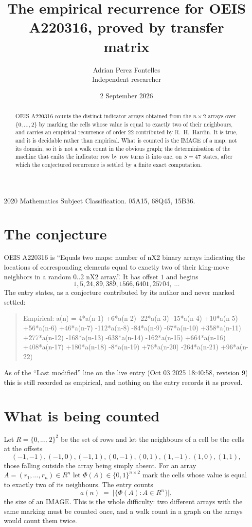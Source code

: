 \documentclass[11pt,a4paper]{article}
\title{The empirical recurrence for OEIS A220316, proved by transfer matrix}
\author{Adrian Perez Fontelles\\ \small Independent researcher}
\date{2 September 2026}
\theoremstyle{plain}
\theoremstyle{definition}
\begin{document}
\maketitle

\begin{abstract}
OEIS A220316 counts the distinct indicator arrays obtained from the $n\times2$ arrays over
$\{0,\dots,2\}$ by marking the cells whose value is equal to exactly two of their neighbours, and carries an
empirical recurrence of order $22$ contributed by R.~H.~Hardin. It is true, and it is
decidable rather than empirical. What is counted is the IMAGE of a map, not its domain, so it
is not a walk count in the obvious graph; the determinisation of the machine that emits the
indicator row by row turns it into one, on $S=47$ states, after which the conjectured
recurrence is settled by a finite exact computation.
\end{abstract}

\noindent\small 2020 Mathematics Subject Classification. 05A15, 68Q45, 15B36.\normalsize

\section{The conjecture}

OEIS A220316 is ``Equals two maps: number of nX2 binary arrays indicating the locations of corresponding elements equal to exactly two of their king-move neighbors in a random 0..2 nX2 array.''. It has offset $1$ and begins
\[
1, 5, 24, 89, 389, 1566, 6401, 25704,\ \dots
\]
The entry states, as a conjecture contributed by its author and never marked settled:
\begin{quote}
Empirical: a(n) = 4*a(n-1) +6*a(n-2) -22*a(n-3) -15*a(n-4) +10*a(n-5) +56*a(n-6) +46*a(n-7) -112*a(n-8) -84*a(n-9) -67*a(n-10) +358*a(n-11) +277*a(n-12) -168*a(n-13) -638*a(n-14) -162*a(n-15) +664*a(n-16) +408*a(n-17) +180*a(n-18) -8*a(n-19) +76*a(n-20) -264*a(n-21) +96*a(n-22)
\end{quote}
As of the ``Last modified'' line on the live entry (Oct 03 2025 18:40:58, revision 9) this is still
recorded as empirical, and nothing on the entry records it as proved.

\section{What is being counted}

Let $R=\{0,\dots,2\}^{2}$ be the set of rows and let the neighbours of a cell be the
cells at the offsets
\[
(-1,-1), (-1,0), (-1,1), (0,-1), (0,1), (1,-1), (1,0), (1,1),
\]
those falling outside the array being simply absent. For an array
$A=(r_1,\dots,r_n)\in R^n$ let $\Phi(A)\in\{0,1\}^{n\times2}$ mark the cells whose value
is equal to exactly two of its neighbours. The entry counts
\[
a(n)\;=\;\bigl|\{\Phi(A):A\in R^n\}\bigr| ,
\]
the size of an IMAGE. This is the whole difficulty: two different arrays with the same marking
must be counted once, and a walk count in a graph on the arrays would count them twice.
\end{document}
